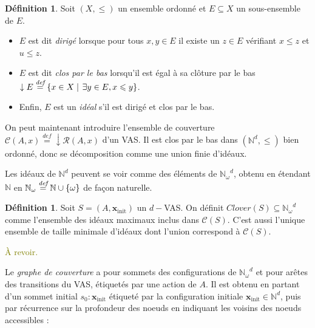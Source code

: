 \documentclass[a4paper,final]{article}
\theoremstyle{definition}
\newtheorem{Definition}[Theorem]{Définition}
\let\leq\leqslant
\newcommand{\lucas}[1]{\textcolor{olive}{#1}}
\newcommand{\set}[2]{\left\{#1\mathrel{\left|\vphantom{#1}\vphantom{#2}\right.}#2\right\}}
\newcommand{\os}[1]{\left\{\mathinner{#1}\right\}}
\newcommand{\defeq}{\ensuremath{\stackrel{\textit{def}}{=}}}
\let\union\cup
\newcommand{\N}{\ensuremath{\mathbb{N}}}
\newcommand{\Nomega}{\ensuremath{\mathbb{N}_\omega}}
\newcommand{\reach}{\ensuremath{\mathcal{R}}}
\newcommand{\cover}{\ensuremath{\mathcal{C}}}
\newcommand{\clover}{\textit{Clover}}
\newcommand{\vect}[1]{\ensuremath{\mathbf{#1}}}
\newcommand{\xinit}{\ensuremath{\vect{x}_\text{init}}}
\begin{document}
\begin{Definition}
Soit $(X,\leq)$ un ensemble ordonné et $E\subseteq X$ un sous-ensemble de $E$.
\begin{itemize}
    \item $E$ est dit \emph{dirigé} lorsque pour tous $x,y\in E$ il existe un $z\in E$ vérifiant $x\leq z$ et $u\leq z$.
    \item $E$ est dit \emph{clos par le bas} lorsqu'il est égal à sa clôture par le bas $\downarrow E \defeq \set{x\in X}{\exists y\in E, x\leq y}$.
    \item Enfin, $E$ est un \emph{idéal} s'il est dirigé et clos par le bas.
\end{itemize}
\end{Definition}

On peut maintenant introduire l'ensemble de couverture $\cover(A,x) \defeq \downarrow \reach(A,x)$ d'un VAS.
Il est clos par le bas dans $(\N^d,\leq)$ bien ordonné, donc se décomposition comme une union finie d'idéaux.

Les idéaux de $\N^d$ peuvent se voir comme des éléments de $\Nomega^d$, obtenu en étendant $\N$ en $\Nomega\defeq \N\union\os{\omega}$ de façon naturelle. %

\begin{Definition}
Soit $S=(A,\xinit)$ un $d-$VAS.
On définit $\clover(S) \subseteq \Nomega^d$ comme l'ensemble des idéaux maximaux inclus dans $\cover(S)$.
C'est aussi l'unique ensemble de taille minimale d'idéaux dont l'union correspond à $\cover(S)$.
\end{Definition}


\lucas{À revoir.}

Le \emph{graphe de couverture} a pour sommets des configurations de $\Nomega^d$ et pour arêtes des transitions du VAS, étiquetés par une action de $A$.
Il est obtenu en partant d'un sommet initial $s_0:\xinit$ étiqueté par la configuration initiale $\xinit\in \N^d$, puis par récurrence sur la profondeur des noeuds en indiquant les voisins des noeuds accessibles :
\end{document}
